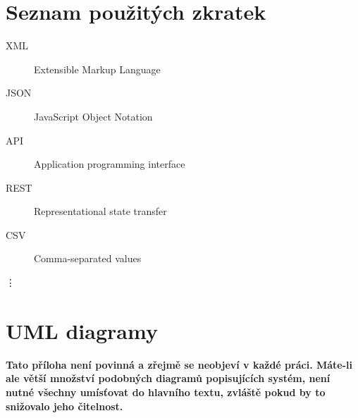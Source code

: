 \documentclass[11pt,twoside,a4paper]{book}
\begin{document}
%
{
\def\CS{$\cal C\kern-0.1667em\lower.5ex\hbox{$\cal S$}\kern-0.075em $}

}

%

\appendix




\chapter{Seznam použitých zkratek}

\begin{description}
\item[XML] Extensible Markup Language
\item[JSON] JavaScript Object Notation
\item[API] Application programming interface
\item[REST] Representational state transfer
\item[CSV] Comma-separated values
\end{description}
\vdots

\chapter{UML diagramy}
\textbf{\large Tato příloha není povinná a zřejmě se neobjeví v každé práci. Máte-li ale větší množství podobných diagramů popisujících systém, není nutné všechny umísťovat do hlavního textu, zvláště pokud by to snižovalo jeho čitelnost.}
\end{document}

